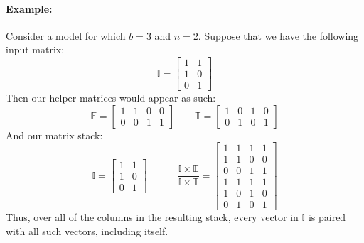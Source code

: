 \paragraph{Example:}
Consider a model for which $b=3$ and $n=2$. Suppose that we have the following 
input matrix: \[ \mathbb{I} = \begin{bmatrix} 1 & 1\\ 1 & 0\\ 0 & 1\end{bmatrix}
\]
Then our helper matrices would appear as such:
\[
	\mathbb{E} = \begin{bmatrix}
		1 & 1 & 0 & 0\\
		0 & 0 & 1 & 1
	\end{bmatrix}
	\hspace{2em}
	\mathbb{T} = \begin{bmatrix}
		1 & 0 & 1 & 0\\
	0 & 1 & 0 & 1 \end{bmatrix}
\]
And our matrix stack:
\[
	\mathbb{I} = \begin{bmatrix} 1 & 1\\ 1 & 0\\ 0 & 1\end{bmatrix}
	\hspace{3em}
	\frac{\mathbb{I} \times \mathbb{E}}{\mathbb{I} \times \mathbb{T}} = 
	\begin{bmatrix}
		1 & 1 & 1 & 1\\
		1 & 1 & 0 & 0\\
		0 & 0 & 1 & 1\\
		1 & 1 & 1 & 1\\
		1 & 0 & 1 & 0\\
		0 & 1 & 0 & 1
	\end{bmatrix}
\]
Thus, over all of the columns in the resulting stack, every vector in 
$\mathbb{I}$ is paired with all such vectors, including itself.

